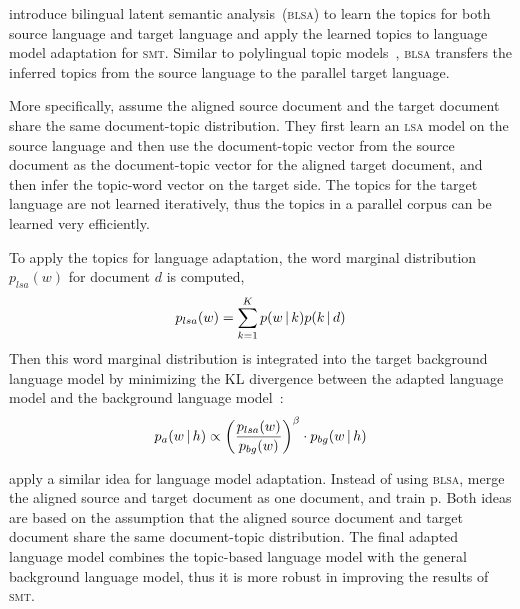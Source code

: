 \citet{Tam-2007} introduce bilingual latent semantic
analysis~(\textsc{blsa}) to learn the topics for both source language
and target language and apply the learned topics to language model
adaptation for \textsc{smt}. Similar to polylingual topic models~\citep{mimno-09}, 
\textsc{blsa} transfers the inferred
topics from the source language to the parallel target language.

More specifically, \citet{Tam-2007} assume the aligned source document
and the target document share the same document-topic distribution.
They first learn an \textsc{lsa} model on the source
language and then use the document-topic vector from the
source document as the document-topic vector for the aligned
target document, and then infer the topic-word vector on the
target side. The topics for the target language are not learned
iteratively, thus the topics in a parallel corpus can be learned very
efficiently.

To apply the topics for language adaptation, the word
marginal distribution $p_{lsa}(w)$ for document $d$ is computed,
\begin{align}
p_{lsa}(w) = \sum_{k=1}^K p(w \, | \, k) p(k \, | \, d)
\end{align}
Then this word marginal distribution is integrated into the target
background language model by minimizing the KL divergence between the
adapted language model and the background language
model~\citep{Kneser-1997b}:
\begin{align}
\label{eq:mdi}
p_a(w \, | \, h) \propto \left( \frac{p_{lsa}(w)}{p_{bg}(w)} \right) ^{\beta}
  \cdot p_{bg}(w \, | \, h)
\end{align}

\citet{Ruiz-2011} apply a similar idea for language model
adaptation. Instead of using \textsc{blsa}, \citet{Ruiz-2011} 
merge the aligned source and target document as one document, and
train p. Both ideas are
based on the assumption that the aligned source document and target
document share the same document-topic distribution. The final adapted
language model combines the topic-based language model with the
general background language model, thus it is more robust in improving
the results of \textsc{smt}.

